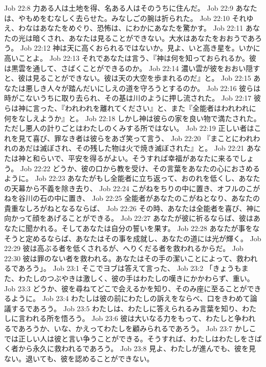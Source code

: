 Job 22:8  力ある人は土地を得、名ある人はそのうちに住んだ。
Job 22:9  あなたは、やもめをむなしく去らせた。みなしごの腕は折られた。
Job 22:10  それゆえ、わなはあなたをめぐり、恐怖は、にわかにあなたを驚かす。
Job 22:11  あなたの光は暗くされ、あなたは見ることができない。大水はあなたをおおうであろう。
Job 22:12  神は天に高くおられるではないか。見よ、いと高き星を。いかに高いことよ。
Job 22:13  それであなたは言う、『神は何を知っておられるか。彼は黒雲を通して、さばくことができるのか。
Job 22:14  濃い雲が彼をおおい隠すと、彼は見ることができない。彼は天の大空を歩まれるのだ』と。
Job 22:15  あなたは悪しき人々が踏んだいにしえの道を守ろうとするのか。
Job 22:16  彼らは時がこないうちに取り去られ、その基は川のように押し流された。
Job 22:17  彼らは神に言った、『われわれを離れてください』と、また『全能者はわれわれに何をなしえようか』と。
Job 22:18  しかし神は彼らの家を良い物で満たされた。ただし悪人の計りごとはわたしのくみする所ではない。
Job 22:19  正しい者はこれを見て喜び、罪なき者は彼らをあざ笑って言う、
Job 22:20  『まことにわれわれのあだは滅ぼされ、その残した物は火で焼き滅ぼされた』と。
Job 22:21  あなたは神と和らいで、平安を得るがよい。そうすれば幸福があなたに来るでしょう。
Job 22:22  どうか、彼の口から教を受け、その言葉をあなたの心におさめるように。
Job 22:23  あなたがもし全能者に立ち返って、おのれを低くし、あなたの天幕から不義を除き去り、
Job 22:24  こがねをちりの中に置き、オフルのこがねを谷川の石の中に置き、
Job 22:25  全能者があなたのこがねとなり、あなたの貴重なしろがねとなるならば、
Job 22:26  その時、あなたは全能者を喜び、神に向かって顔をあげることができる。
Job 22:27  あなたが彼に祈るならば、彼はあなたに聞かれる。そしてあなたは自分の誓いを果す。
Job 22:28  あなたが事をなそうと定めるならば、あなたはその事を成就し、あなたの道には光が輝く。
Job 22:29  彼は高ぶる者を低くされるが、へりくだる者を救われるからだ。
Job 22:30  彼は罪のない者を救われる。あなたはその手の潔いことによって、救われるであろう」。
Job 23:1  そこでヨブは答えて言った、
Job 23:2  「きょうもまた、わたしのつぶやきは激しく、彼の手はわたしの嘆きにかかわらず、重い。
Job 23:3  どうか、彼を尋ねてどこで会えるかを知り、そのみ座に至ることができるように。
Job 23:4  わたしは彼の前にわたしの訴えをならべ、口をきわめて論議するであろう。
Job 23:5  わたしは、わたしに答えられるみ言葉を知り、わたしに言われる所を悟ろう。
Job 23:6  彼は大いなる力をもって、わたしと争われるであろうか、いな、かえってわたしを顧みられるであろう。
Job 23:7  かしこでは正しい人は彼と言い争うことができる。そうすれば、わたしはわたしをさばく者から永久に救われるであろう。
Job 23:8  見よ、わたしが進んでも、彼を見ない。退いても、彼を認めることができない。
